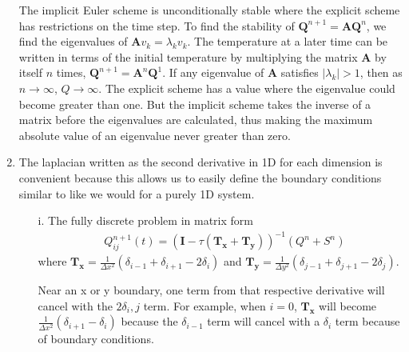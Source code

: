 \begin{enumerate}
	The implicit Euler scheme is unconditionally stable where the explicit scheme has restrictions on the time step.  To find the stability of $\mathbf{Q}^{n+1}=\mathbf{A}\mathbf{Q}^n$, we find the eigenvalues of $\mathbf{A} v_k=\lambda_k v_k$.  The temperature at a later time can be written in terms of the initial temperature by multiplying the matrix $\mathbf{A}$ by itself $n$ times, $\mathbf{Q}^{n+1}=\mathbf{A}^n\mathbf{Q}^1$. If any eigenvalue of $\mathbf{A}$ satisfies $|\lambda_k|>1$, then as $n \to \infty$, $Q \to \infty$.\cite{garcia2000numerical}
	The explicit scheme has a value where the eigenvalue could become greater than one.  But the implicit scheme takes the inverse of a matrix before the eigenvalues are calculated, thus making the maximum absolute value of an eigenvalue never greater than zero.
	\item The laplacian written as the second derivative in 1D for each dimension is convenient because this allows us to easily define the boundary conditions similar to like we would for a purely 1D system.  
	\begin{itemize}
		\item[i.]  The fully discrete problem in matrix form
		\begin{align*}
			& Q_{ij}^{n+1}(t) = (\mathbf{I}-\tau (\mathbf{T_x} + \mathbf{T_y}))^{-1} (Q^n+S^n) 
		\end{align*}
		where $\mathbf{T_{x}} = \frac{1}{\Delta x^2}(\delta_{i-1} + \delta_{i+1} - 2\delta_{i})$ and $\mathbf{T_{y}} = \frac{1}{\Delta y^2}(\delta_{j-1} + \delta_{j+1} - 2\delta_{j})$.  
		
		Near an x or y boundary, one term from that respective derivative will cancel with the $2 \delta_i,j$ term.  For example, when $i=0$, $\mathbf{T_{x}}$ will become $\frac{1}{\Delta x^2}( \delta_{i+1} - \delta_{i})$ because the $\delta_{i-1}$ term will cancel with a $\delta_{i}$ term because of boundary conditions.
	\end{itemize}
\end{enumerate}

